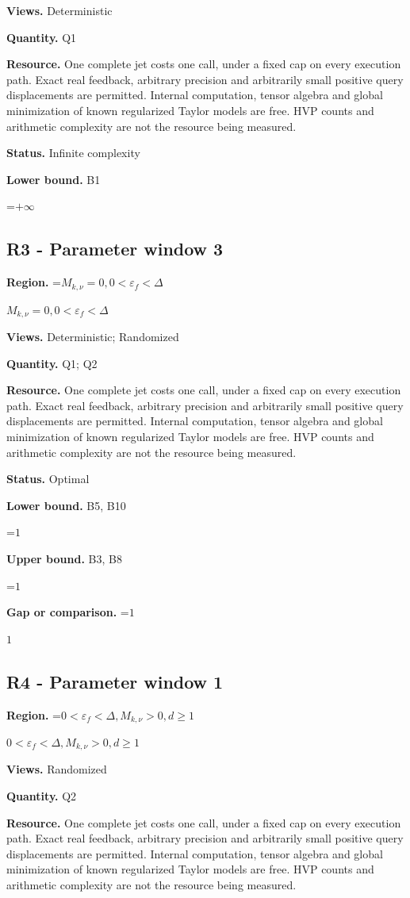 \documentclass[10pt,a4paper]{article}
\newcommand{\AtlasMath}[1]{\par\begingroup\centering\setbox0=\hbox{$\displaystyle #1$}\ifdim\wd0>1.4\linewidth\typeout{ATLAS WIDE FORMULA: \the\wd0}\fi\ifdim\wd0>\linewidth\resizebox{\linewidth}{!}{\box0}\else\box0\fi\par\endgroup}
\newcommand{\AtlasInlineMath}[1]{\begingroup\setbox0=\hbox{$#1$}\ifdim\wd0>.4\linewidth\endgroup\AtlasMath{#1}\else\endgroup$#1$\fi}
\begin{document}
\textbf{Views.} Deterministic

\textbf{Quantity.} Q1

\textbf{Resource.} One complete jet costs one call, under a fixed cap on every execution path. Exact real feedback, arbitrary precision and arbitrarily small positive query displacements are permitted. Internal computation, tensor algebra and global minimization of known regularized Taylor models are free. HVP counts and arithmetic complexity are not the resource being measured.

\textbf{Status.} Infinite complexity

\textbf{Lower bound.} B1

\AtlasMath{+\infty}
\subsection{R3 - Parameter window 3}
\textbf{Region.} \AtlasInlineMath{M_{k,\nu}=0,0<\varepsilon_f<\Delta}

\textbf{Views.} Deterministic; Randomized

\textbf{Quantity.} Q1; Q2

\textbf{Resource.} One complete jet costs one call, under a fixed cap on every execution path. Exact real feedback, arbitrary precision and arbitrarily small positive query displacements are permitted. Internal computation, tensor algebra and global minimization of known regularized Taylor models are free. HVP counts and arithmetic complexity are not the resource being measured.

\textbf{Status.} Optimal

\textbf{Lower bound.} B5, B10

\AtlasMath{1}
\textbf{Upper bound.} B3, B8

\AtlasMath{1}
\textbf{Gap or comparison.} \AtlasInlineMath{1}

\subsection{R4 - Parameter window 1}
\textbf{Region.} \AtlasInlineMath{0<\varepsilon_f<\Delta,M_{k,\nu}>0,d\ge 1}

\textbf{Views.} Randomized

\textbf{Quantity.} Q2

\textbf{Resource.} One complete jet costs one call, under a fixed cap on every execution path. Exact real feedback, arbitrary precision and arbitrarily small positive query displacements are permitted. Internal computation, tensor algebra and global minimization of known regularized Taylor models are free. HVP counts and arithmetic complexity are not the resource being measured.
\end{document}
